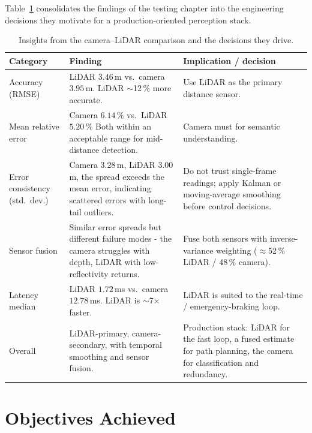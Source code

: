 \documentclass[12pt, a4paper]{report}
\begin{document}
Table~\ref{tab:insights} consolidates the findings of the testing chapter into
the engineering decisions they motivate for a production-oriented perception
stack.

\begin{table}[H]
\centering
\caption{Insights from the camera--LiDAR comparison and the decisions they drive.}
\label{tab:insights}
\renewcommand{\arraystretch}{1.25}
\begin{tabular}{@{}p{}p{}p{}@{}}
\toprule
\textbf{Category} & \textbf{Finding} & \textbf{Implication / decision} \\
\midrule
Accuracy (RMSE) & LiDAR $3.46$\,m vs.\ camera $3.95$\,m. LiDAR $\sim$12\,\% more accurate. & Use LiDAR as the primary distance sensor. \\
Mean relative error & Camera $6.14\,\%$ vs.\ LiDAR $5.20\,\%$ Both within an acceptable range for mid-distance detection. & Camera must for semantic understanding. \\
Error consistency (std.\ dev.) & Camera $3.28$\,m, LiDAR $3.00$\,m, the spread exceeds the mean error, indicating scattered errors with long-tail outliers. & Do not trust single-frame readings; apply Kalman or moving-average smoothing before control decisions. \\
Sensor fusion & Similar error spreads but different failure modes - the camera struggles with depth, LiDAR with low-reflectivity returns. & Fuse both sensors with inverse-variance weighting ($\approx$52\,\% LiDAR / 48\,\% camera). \\
Latency   median & LiDAR $1.72$\,ms vs.\ camera $12.78$\,ms. LiDAR is $\sim$7$\times$ faster. & LiDAR is suited to the real-time / emergency-braking loop. \\
Overall & LiDAR-primary, camera-secondary, with temporal smoothing and sensor fusion. & Production stack: LiDAR for the fast loop, a fused estimate for path planning, the camera for classification and redundancy. \\
\bottomrule
\end{tabular}
\end{table}


\section{Objectives Achieved}
\end{document}
